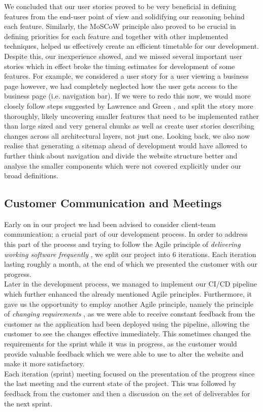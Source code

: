 \documentclass{l3proj}
\begin{document}
        We concluded that our user stories proved to be very beneficial in defining features from the end-user point of view and solidifying our reasoning behind each feature. Similarly, the MoSCoW principle also proved to be crucial in defining priorities for each feature and together with other implemented techniques, helped us effectively create an efficient timetable for our development. Despite this, our inexperience showed, and we missed several important user stories which in effect broke the timing estimates for development of some features. For example, we considered a user story for a user viewing a business page however, we had completely neglected how the user gets access to the business page (i.e. navigation bar). If we were to redo this now, we would more closely follow steps suggested by Lawrence and Green \cite{stories}, and split the story more thoroughly, likely uncovering smaller features that need to be implemented rather than large sized and very general chunks as well as create user stories describing changes across all architectural layers, not just one. Looking back, we also now realise that generating a sitemap \cite{map} ahead of development would have allowed to further think about navigation and divide the website structure better and analyse the smaller components which were not covered explicitly under our broad definitions.
    
    \subsection{Customer Communication and Meetings}
    \label{sec:communication}
        Early on in our project we had been advised to consider client-team communication; a crucial part of our development process. In order to address this part of the process and trying to follow the Agile principle of \textit{delivering working
        software frequently} \cite{manifesto}, we split our project into 6 iterations. Each iteration lasting roughly a month, at the end of which we presented the customer with our progress.\\
        Later in the development process, we managed to implement our CI/CD pipeline which further enhanced the already mentioned Agile principles. Furthermore, it gave us the opportunity to employ another Agile principle, namely the principle of \textit{changing requirements} \cite{manifesto}, as we were able to receive constant feedback from the customer as the application had been deployed using the pipeline, allowing the customer to see the changes effective immediately. This sometimes changed the requirements for the sprint while it was in progress, as the customer would provide valuable feedback which we were able to use to alter the website and make it more satisfactory.\\
        \newline
        Each iteration (sprint) meeting focused on the presentation of the progress since the last meeting and the current state of the project. This was followed by feedback from the customer and then a discussion on the set of deliverables for the next sprint.
        
\end{document}
